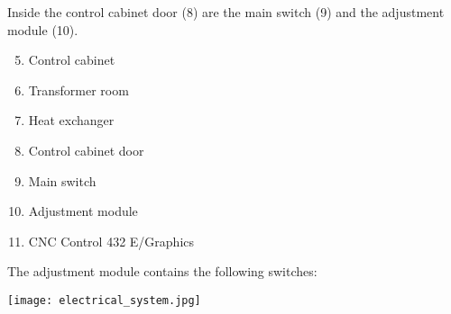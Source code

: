 \vspace{0.3cm}
\noindent Inside the control cabinet door (8) are the main switch (9) and the adjustment module (10).




\begin{minipage}[c]{0.45\textwidth}
    \begin{enumerate}[itemsep=1pt,parsep=0pt]
        \setcounter{enumi}{4}
        \item Control cabinet
        \item Transformer room
        \item Heat exchanger
        \item Control cabinet door
        \item Main switch
        \item Adjustment module
        \item CNC Control 432 E/Graphics
    \end{enumerate}

    \noindent The adjustment module contains the following switches:
\end{minipage}%
\begin{minipage}{0.6\textwidth}
    \centering
    \texttt{[image: electrical\_system.jpg]}
    \label{fig:electrical_system}
\end{minipage}


